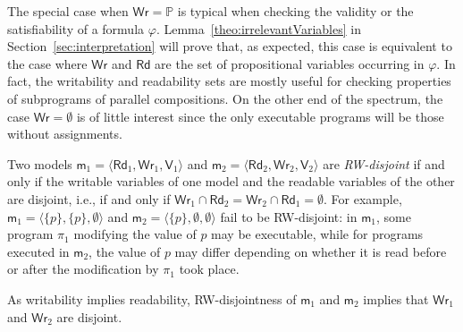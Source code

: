 \documentclass{llncs}
\newcommand{\modl}{\mathsf m}
\newcommand{\readset}{\mathsf{Rd}}
\newcommand{\valuset}{\mathsf{V}}
\newcommand{\writeset}{\mathsf{Wr}}
\renewcommand{\phi}{\varphi}
\newcommand{\propset}{\mathbb P}
\newcommand{\set}[1]{\{#1\}}
\newcommand{\tuple}[1]{ \langle #1 \rangle}
\begin{document}
The special case when $\writeset = \propset$ is typical when checking the validity or the satisfiability of a formula $\phi$.
Lemma~\ref{theo:irrelevantVariables} in Section~\ref{sec:interpretation} will prove that,
as expected, this case is equivalent to the case where $\writeset$ and $\readset$ are the set of propositional variables occurring in $\phi$.
In fact, the writability and readability sets are mostly useful for checking properties of subprograms of parallel compositions.
On the other end of the spectrum, the case $\writeset = \emptyset$ is of little interest since the only executable programs will be those without assignments.

Two models 
$\modl_1 = \tuple{\readset_1,\writeset_1,\valuset_1}$ and 
$\modl_2 = \tuple{\readset_2,\writeset_2,\valuset_2}$ are \emph{RW-disjoint} 
if and only if the writable variables of one model and the readable variables of the other are disjoint, i.e., 
if and only if $\writeset_1 \cap \readset_2  = \writeset_2 \cap \readset_1  = \emptyset $. 
For example, 
$\modl_1 = \tuple{ \set p , \set p , \emptyset}$ and 
$\modl_2 = \tuple{ \set p , \emptyset , \emptyset}$ fail to be RW-disjoint:
in $\modl_1$, some program $\pi_1$ modifying the value of $p$ may be executable, while 
for programs executed in $\modl_2$, the value of $p$ %
may differ depending on whether it is read 
before or after the modification by $\pi_1$ took place. 

As writability implies readability, %
RW-disjointness of $\modl_1$ and $\modl_2$ implies that
$\writeset_1$ and $\writeset_2$ are disjoint. 
\end{document}
